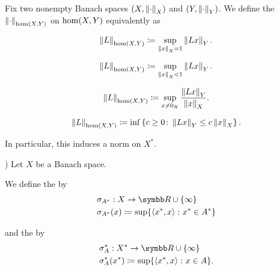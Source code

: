 \begin{definition}\label{def:dual_norm}
  Fix two nonempty Banach spaces \( (X, \left\Vert \cdot \right\Vert_X) \) and \( (Y, \left\Vert \cdot \right\Vert_Y) \). We define the  \( \left\Vert \cdot \right\Vert_{\operatorname{hom}(X, Y)} \) on \( \operatorname{hom}(X, Y) \) equivalently as
  \begin{defenum}
    \begin{equation*}
      \left\Vert L \right\Vert_{\operatorname{hom}(X, Y)} \coloneqq \sup_{\left\Vert x \right\Vert_X = 1} \left\Vert Lx \right\Vert_Y.
    \end{equation*}

    \begin{equation*}
      \left\Vert L \right\Vert_{\operatorname{hom}(X, Y)} \coloneqq \sup_{\left\Vert x \right\Vert_X < 1} \left\Vert Lx \right\Vert_Y.
    \end{equation*}

    \begin{equation*}
      \left\Vert L \right\Vert_{\operatorname{hom}(X, Y)} \coloneqq \sup_{x \neq 0_X} \frac {\left\Vert Lx \right\Vert_Y} {\left\Vert x \right\Vert_X}.
    \end{equation*}

    \begin{equation*}
      \left\Vert L \right\Vert_{\operatorname{hom}(X, Y)} \coloneqq \inf \left\{ c \geq 0 \colon \left\Vert Lx \right\Vert_Y \leq c \left\Vert x \right\Vert_X \right\}.
    \end{equation*}
  \end{defenum}

  In particular, this induces a norm on \( X^* \).
\end{definition}

\begin{definition}\label{def:banach_space_support_function}\cite[example 3.2(a)]{Phelps1993})
  Let \( X \) be a Banach space.

  We define the  by
  \begin{align*}
    &\sigma_{A^*}: X \to \R \cup \{ \infty \} \\
    &\sigma_{A^*}(x) \coloneqq \sup \{ \Prod {x^*} x \colon x^* \in A^* \}
  \end{align*}

  and the  by
  \begin{align*}
    &\sigma^*_A: X^* \to \R \cup \{ \infty \} \\
    &\sigma^*_A(x^*) \coloneqq \sup \{ \Prod {x^*} x \colon x \in A \}.
  \end{align*}
\end{definition}

